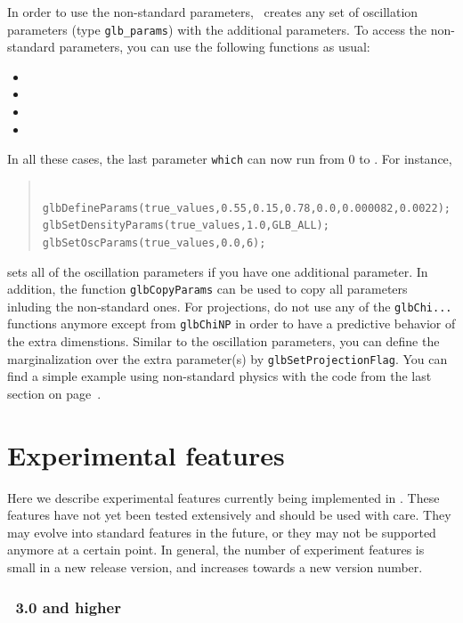 In order to use the non-standard parameters, \GLOBES\ creates any set of oscillation parameters (type {\tt glb\_params})
with the additional parameters. To access the non-standard parameters, you can use the following functions as usual:
\begin{itemize}
\item
{}
\item
{}
\item
{}
\item
{}
\end{itemize}
In all these cases, the last parameter {\tt which} can now run from $0$ to . For instance,
\begin{quote}
{\tt
 glbDefineParams(true\_values,0.55,0.15,0.78,0.0,0.000082,0.0022); \\
 glbSetDensityParams(true\_values,1.0,GLB\_ALL); \\
 glbSetOscParams(true\_values,0.0,6);
}
\end{quote}
sets all of the oscillation parameters if you have one additional parameter. 
In addition, the function {\tt glbCopyParams}
can be used to copy all parameters inluding the non-standard ones. For projections,
do not use any of the {\tt glbChi...} functions anymore except from {\tt glbChiNP} in order to have a
predictive behavior of the extra dimenstions. Similar to the oscillation parameters, you can define
the marginalization over the extra parameter(s) by {\tt glbSetProjectionFlag}. You can find a simple
example using non-standard physics with the code from the last section on page~\pageref{ex:nsphysics}.



\chapter{Experimental features}

Here we describe experimental features currently being implemented in \GLOBES . These features have not yet been tested extensively and should be used with care. They may evolve into standard features in the future, or they may not be supported anymore at a certain point. In general, the number of experiment features is small in a new release version, and increases towards a new version number.

\subsection*{\GLOBES\ 3.0 and higher}

